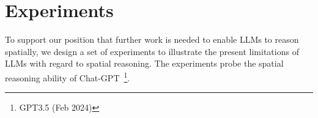 \section{Experiments}
\label{section:experiments}

To support our position that further work is needed to enable LLMs to reason spatially, we design a set of experiments to illustrate the present limitations of LLMs with regard to spatial reasoning.
The experiments probe the spatial reasoning ability of Chat-GPT~\footnote{GPT3.5 (Feb 2024)}.







